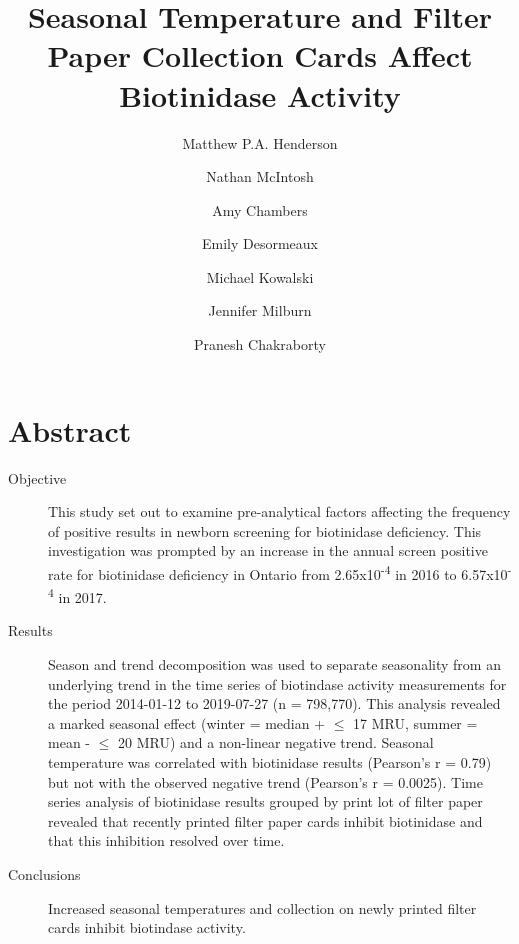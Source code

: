 \documentclass[review]{elsarticle}
\date{}
\title{}
\begin{document}
\makeatletter
\newcommand{\citeprocitem}[2]{\hyper@linkstart{cite}{citeproc_bib_item_#1}#2\hyper@linkend}
\makeatother



\begin{frontmatter}
\title{Seasonal Temperature and Filter Paper Collection Cards Affect Biotinidase Activity}
\author[NSO, UoO]{Matthew P.A. Henderson}
\author[NSO]{Nathan McIntosh}
\author[NSO]{Amy Chambers}
\author[NSO]{Emily Desormeaux}
\author[NSO]{Michael Kowalski}
\author[NSO]{Jennifer Milburn}
\author[NSO, UO]{Pranesh Chakraborty}
\address[NSO]{Newborn Screening Ontario, Children's Hospital of Eastern Ontario}
\address[UoO]{Department of Medicine, University of Ottawa} 
\end{frontmatter}

\section*{Abstract}
\label{sec:orga4c5dd8}
\begin{description}
\item[{Objective}] This study set out to examine pre-analytical factors
affecting the frequency of positive results in newborn screening for
biotinidase deficiency. This investigation was prompted by an
increase in the annual screen positive rate for biotinidase deficiency
in Ontario from 2.65x10\textsuperscript{-4} in 2016 to 6.57x10\textsuperscript{-4} in 2017.

\item[{Results}] Season and trend decomposition was used to separate
seasonality from an underlying trend in the time series of
biotindase activity measurements for the period 2014-01-12 to
2019-07-27 (n = 798,770). This analysis revealed a marked seasonal
effect (winter = median + \(\le\) 17 MRU, summer = mean - \(\le\) 20 MRU)
and a non-linear negative trend. Seasonal temperature was correlated
with biotinidase results (Pearson's r = 0.79) but not with the
observed negative trend (Pearson's r = 0.0025). Time series analysis
of biotinidase results grouped by print lot of filter paper revealed
that recently printed filter paper cards inhibit biotinidase and
that this inhibition resolved over time.

\item[{Conclusions}] Increased seasonal temperatures and collection on
newly printed filter cards inhibit biotindase activity.
\end{description}
\end{document}
